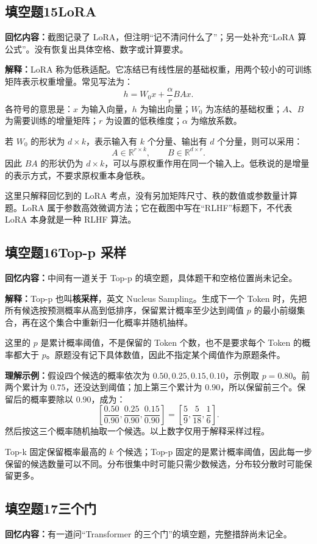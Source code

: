 \documentclass[UTF8,a4paper,zihao=-4,fontset=windows]{ctexart}
\newcommand{\recalled}[1]{\Needspace{8\baselineskip}\subsection*{#1}}
\begin{document}
\recalled{填空题15\quad LoRA}
\textbf{回忆内容：}截图记录了 LoRA，但注明“记不清问什么了”；另一处补充“LoRA 算公式”。没有恢复出具体空格、数字或计算要求。

\textbf{解释：}LoRA 称为低秩适配。它冻结已有线性层的基础权重，用两个较小的可训练矩阵表示权重增量。常见写法为：
\[
h=W_0x+\frac{\alpha}{r}BAx.
\]
各符号的意思是：$x$ 为输入向量，$h$ 为输出向量；$W_0$ 为冻结的基础权重；$A$、$B$ 为需要训练的增量矩阵；$r$ 为设置的低秩维度；$\alpha$ 为缩放系数。

若 $W_0$ 的形状为 $d\times k$，表示输入有 $k$ 个分量、输出有 $d$ 个分量，则可以采用：
\[
A\in\mathbb R^{r\times k},\qquad B\in\mathbb R^{d\times r}.
\]
因此 $BA$ 的形状仍为 $d\times k$，可以与原权重作用在同一个输入上。低秩说的是增量的表示方式，不要求原权重本身低秩。

这里只解释回忆到的 LoRA 考点，没有另加矩阵尺寸、秩的数值或参数量计算题。LoRA 属于参数高效微调方法；它在截图中写在“RLHF”标题下，不代表 LoRA 本身就是一种 RLHF 算法。

\recalled{填空题16\quad Top-p 采样}
\textbf{回忆内容：}中间有一道关于 Top-p 的填空题，具体题干和空格位置尚未记全。

\textbf{解释：}Top-p 也叫\textbf{核采样}，英文 Nucleus Sampling。生成下一个 Token 时，先把所有候选按预测概率从高到低排序，保留累计概率至少达到阈值 $p$ 的最小前缀集合，再在这个集合中重新归一化概率并随机抽样。

这里的 $p$ 是累计概率阈值，不是保留的 Token 个数，也不是要求每个 Token 的概率都大于 $p$。原题没有记下具体数值，因此不指定某个阈值作为原题条件。

\textbf{理解示例：}假设四个候选的概率依次为 $0.50,0.25,0.15,0.10$，示例取 $p=0.80$。前两个累计为 $0.75$，还没达到阈值；加上第三个累计为 $0.90$，所以保留前三个。保留后的概率要除以 $0.90$，成为：
\[
\left[\frac{0.50}{0.90},\frac{0.25}{0.90},\frac{0.15}{0.90}\right]
=\left[\frac59,\frac5{18},\frac16\right].
\]
然后按这三个概率随机抽取一个候选。以上数字仅用于解释采样过程。

Top-k 固定保留概率最高的 $k$ 个候选；Top-p 固定的是累计概率阈值，因此每一步保留的候选数量可以不同。分布很集中时可能只需少数候选，分布较分散时可能保留更多。

\recalled{填空题17\quad 三个门}
\textbf{回忆内容：}有一道问“Transformer 的三个门”的填空题，完整措辞尚未记全。
\end{document}
